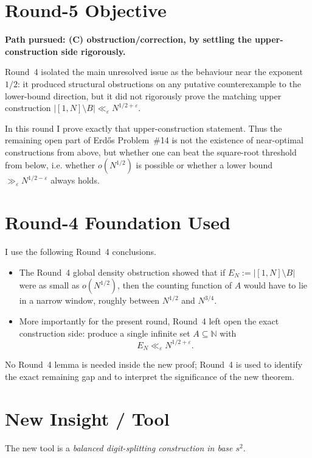 \section{Round-5 Objective}
\label{sec:round5-objective}
\textbf{Path pursued: (C) obstruction/correction, by settling the upper-construction side rigorously.}

Round~4 isolated the main unresolved issue as the behaviour near the exponent $1/2$: it produced structural obstructions on any putative counterexample to the lower-bound direction, but it did not rigorously prove the matching upper construction $|[1,N]\setminus B|\ll_\varepsilon N^{1/2+\varepsilon}$.

In this round I prove exactly that upper-construction statement. Thus the remaining open part of Erd\H{o}s Problem~\#14 is not the existence of near-optimal constructions from above, but whether one can beat the square-root threshold from below, i.e. whether $o(N^{1/2})$ is possible or whether a lower bound $\gg_\varepsilon N^{1/2-\varepsilon}$ always holds.

\section{Round-4 Foundation Used}
\label{sec:round4-foundation-used}
I use the following Round~4 conclusions.
\begin{itemize}
\item The Round~4 global density obstruction showed that if $E_N:=|[1,N]\setminus B|$ were as small as $o(N^{1/2})$, then the counting function of $A$ would have to lie in a narrow window, roughly between $N^{1/2}$ and $N^{3/4}$.
\item More importantly for the present round, Round~4 left open the exact construction side: produce a single infinite set $A\subseteq \mathbb N$ with
\[
E_N\ll_\varepsilon N^{1/2+\varepsilon}.
\]
\end{itemize}
No Round~4 lemma is needed inside the new proof; Round~4 is used to identify the exact remaining gap and to interpret the significance of the new theorem.

\section{New Insight / Tool}
\label{sec:round5-new-tool}
The new tool is a \emph{balanced digit-splitting construction in base $s^2$}.

